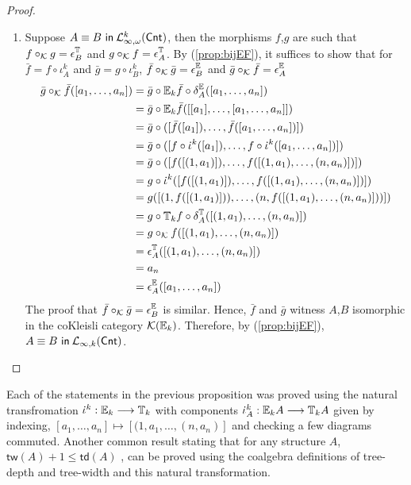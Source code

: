 \begin{prop}
\begin{proof}
\begin{enumerate}[label=(\arabic*)]
\item Suppose ${A \equiv B \ \mathsf{in}\: \mathcal{L}^{k}_{\infty,\omega}(\mathsf{Cnt})}$, then the morphisms $f$,$g$ are such that $f \circ_{\mathcal{K}} g = \epsilon^{{\mathbb{T}_{}}}_{B}$ and  $g \circ_{\mathcal{K}} f = \epsilon^{{\mathbb{T}_{}}}_{A}$. By (\ref{prop:bijEF}), it suffices to show that for $\bar{f} = f \circ \iota^{k}_{A}$ and $\bar{g} = g \circ \iota^{k}_{B}$, $\bar{f} \circ_{\mathcal{K}} \bar{g} = \epsilon^{{\mathbb{E}_{}}}_{B}$ and $\bar{g} \circ_{\mathcal{K}} \bar{f} = \epsilon^{{\mathbb{E}_{}}}_{A}$ 
\begin{align*}
\bar{g} \circ_{\mathcal{K}} \bar{f}([a_{1},\dots,a_{n}]) &= \bar{g} \circ \efcomonad{k}{\bar{f}} \circ \delta^{\efcomonad{}{}}_{A}([a_{1},\dots,a_{n}]) \\
&= \bar{g} \circ \efcomonad{k}{\bar{f}}([[a_{1}],\dots,[a_{1},\dots,a_{n}]]) \\
&= \bar{g} \circ ([\bar{f}([a_{1}]),\dots,\bar{f}([a_{1},\dots,a_{n}])]) \\
&= \bar{g} \circ ([f \circ \iota^{k}([a_{1}]),\dots,f \circ \iota^{k}([a_{1},\dots,a_{n}])]) \\
&= \bar{g} \circ ([f([(1,a_{1})]),\dots,f([(1,a_{1}),\dots,(n,a_{n})])]) \\
&= g \circ \iota^{k} ([f([(1,a_{1})]),\dots,f([(1,a_{1}),\dots,(n,a_{n})])]) \\
&= g ([(1,f([(1,a_{1})])),\dots,(n,f([(1,a_{1}),\dots,(n,a_{n})]))]) \\
&= g \circ \pcomonad{k}{f} \circ \delta^{\pcomonad{}{}}_{A}([(1,a_{1}),\dots,(n,a_{n})]) \\
&= g \circ_{\mathcal{K}} f([(1,a_{1}),\dots,(n,a_{n})]) \\
&= \epsilon^{\pcomonad{}{}}_{A}([(1,a_{1}),\dots,(n,a_{n})]) \\
&= a_{n} \\
&= \epsilon^{\efcomonad{}{}}_{A}([a_{1},\dots,a_{n}]) \\
\end{align*}
The proof that $\bar{f} \circ_{\mathcal{K}} \bar{g} = \epsilon^{{\mathbb{E}_{}}}_{B}$ is similar. Hence, $\bar{f}$ and $\bar{g}$ witness $A$,$B$ isomorphic in the coKleisli category $\mathcal{K}({\mathbb{E}_{k}})$. Therefore, by (\ref{prop:bijEF}), ${A \equiv B \ \mathsf{in}\: \mathcal{L}_{\infty,k}(\mathsf{Cnt})}$.
\end{enumerate}
\end{proof}
\label{prop:kRankToKVariable}
\end{prop}
Each of the statements in the previous proposition was proved using the natural transfromation $\iota^{k}:\efcomonad{k}{} \longrightarrow \pcomonad{k}{}$ with components $\iota^{k}_{A}:\efcomonad{k}{A} \longrightarrow \pcomonad{k}{A}$ given by indexing, $[a_{1},\dots,a_{n}] \mapsto [(1,a_{1},\dots,(n,a_{n})]$ and checking a few diagrams commuted. Another common result stating that for any structure $A$, $\mathsf{tw}(A) + 1 \leq \mathsf{td}(A)$ \cite{Bodlaender1995}, can be proved using the coalgebra definitions of tree-depth and tree-width and this natural transformation. 
